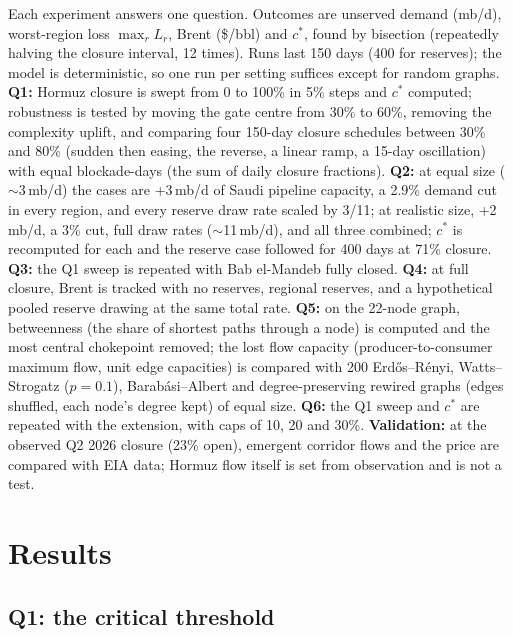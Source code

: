 \documentclass[11pt,a4paper]{article}
\begin{document}
Each experiment answers one question. Outcomes are unserved demand (mb/d), worst-region loss $\max_r L_r$, Brent (\$/bbl) and $c^{*}$, found by bisection (repeatedly halving the closure interval, 12 times). Runs last 150 days (400 for reserves); the model is deterministic, so one run per setting suffices except for random graphs. \textbf{Q1:} Hormuz closure is swept from 0 to 100\% in 5\% steps and $c^{*}$ computed; robustness is tested by moving the gate centre from 30\% to 60\%, removing the complexity uplift, and comparing four 150-day closure schedules between 30\% and 80\% (sudden then easing, the reverse, a linear ramp, a 15-day oscillation) with equal blockade-days (the sum of daily closure fractions). \textbf{Q2:} at equal size ($\sim$3\,mb/d) the cases are +3\,mb/d of Saudi pipeline capacity, a 2.9\% demand cut in every region, and every reserve draw rate scaled by 3/11; at realistic size, +2\,mb/d, a 3\% cut, full draw rates ($\sim$11\,mb/d), and all three combined; $c^{*}$ is recomputed for each and the reserve case followed for 400 days at 71\% closure. \textbf{Q3:} the Q1 sweep is repeated with Bab el-Mandeb fully closed. \textbf{Q4:} at full closure, Brent is tracked with no reserves, regional reserves, and a hypothetical pooled reserve drawing at the same total rate. \textbf{Q5:} on the 22-node graph, betweenness (the share of shortest paths through a node) is computed and the most central chokepoint removed; the lost flow capacity (producer-to-consumer maximum flow, unit edge capacities) is compared with 200 Erdős--Rényi, Watts--Strogatz ($p=0.1$), Barabási--Albert and degree-preserving rewired graphs (edges shuffled, each node's degree kept) of equal size. \textbf{Q6:} the Q1 sweep and $c^{*}$ are repeated with the extension, with caps of 10, 20 and 30\%. \textbf{Validation:} at the observed Q2 2026 closure (23\% open), emergent corridor flows and the price are compared with EIA data; Hormuz flow itself is set from observation and is not a test.


\section{Results}

\subsection{Q1: the critical threshold}\label{sec:q1}
\end{document}
